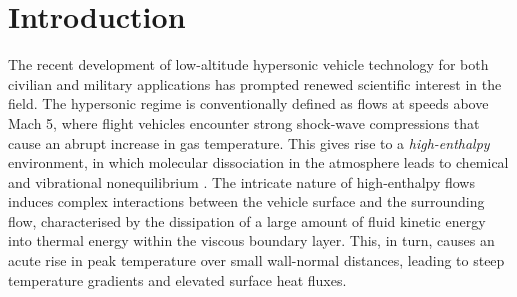 \chapter{Introduction} \label{Chapter:Introduction}


The recent development of low-altitude hypersonic vehicle technology for both civilian and military applications has prompted renewed scientific interest in the field. The hypersonic regime is conventionally defined as flows at speeds above Mach 5, where flight vehicles encounter strong shock-wave compressions that cause an abrupt increase in gas temperature. This gives rise to a \textit{high-enthalpy} environment, in which molecular dissociation in the atmosphere leads to chemical and vibrational nonequilibrium \citep{Candler2019}. The intricate nature of high-enthalpy flows induces complex interactions between the vehicle surface and the surrounding flow, characterised by the dissipation of a large amount of fluid kinetic energy into thermal energy within the viscous boundary layer. This, in turn, causes an acute rise in peak temperature over small wall-normal distances, leading to steep temperature gradients and elevated surface heat fluxes. 

